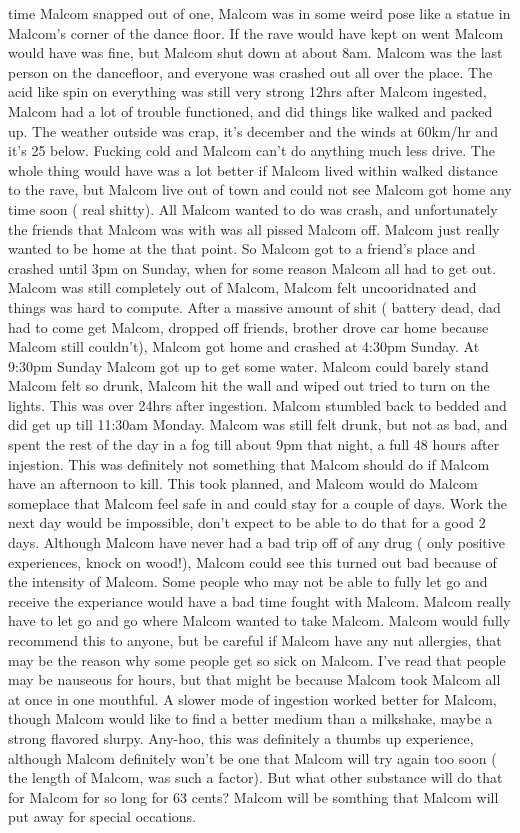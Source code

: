 \documentclass[12pt]{book}
\begin{document}
time Malcom snapped out of one, Malcom was in some weird pose like a statue in Malcom's corner of the dance floor. If the rave would have kept on went Malcom would have was fine, but Malcom shut down at about 8am. Malcom was the last person on the dancefloor, and everyone was crashed out all over the place. The acid like spin on everything was still very strong 12hrs after Malcom ingested, Malcom had a lot of trouble functioned, and did things like walked and packed up. The weather outside was crap, it's december and the winds at 60km/hr and it's 25 below. Fucking cold and Malcom can't do anything much less drive. The whole thing would have was a lot better if Malcom lived within walked distance to the rave, but Malcom live out of town and could not see Malcom got home any time soon ( real shitty). All Malcom wanted to do was crash, and unfortunately the friends that Malcom was with was all pissed Malcom off. Malcom just really wanted to be home at the that point. So Malcom got to a friend's place and crashed until 3pm on Sunday, when for some reason Malcom all had to get out. Malcom was still completely out of Malcom, Malcom felt uncooridnated and things was hard to compute. After a massive amount of shit ( battery dead, dad had to come get Malcom, dropped off friends, brother drove car home because Malcom still couldn't), Malcom got home and crashed at 4:30pm Sunday. At 9:30pm Sunday Malcom got up to get some water. Malcom could barely stand Malcom felt so drunk, Malcom hit the wall and wiped out tried to turn on the lights. This was over 24hrs after ingestion. Malcom stumbled back to bedded and did get up till 11:30am Monday. Malcom was still felt drunk, but not as bad, and spent the rest of the day in a fog till about 9pm that night, a full 48 hours after injestion. This was definitely not something that Malcom should do if Malcom have an afternoon to kill. This took planned, and Malcom would do Malcom someplace that Malcom feel safe in and could stay for a couple of days. Work the next day would be impossible, don't expect to be able to do that for a good 2 days. Although Malcom have never had a bad trip off of any drug ( only positive experiences, knock on wood!), Malcom could see this turned out bad because of the intensity of Malcom. Some people who may not be able to fully let go and receive the experiance would have a bad time fought with Malcom. Malcom really have to let go and go where Malcom wanted to take Malcom. Malcom would fully recommend this to anyone, but be careful if Malcom have any nut allergies, that may be the reason why some people get so sick on Malcom. I've read that people may be nauseous for hours, but that might be because Malcom took Malcom all at once in one mouthful. A slower mode of ingestion worked better for Malcom, though Malcom would like to find a better medium than a milkshake, maybe a strong flavored slurpy. Any-hoo, this was definitely a thumbs up experience, although Malcom definitely won't be one that Malcom will try again too soon ( the length of Malcom, was such a factor). But what other substance will do that for Malcom for so long for 63 cents? Malcom will be somthing that Malcom will put away for special occations.
\end{document}
